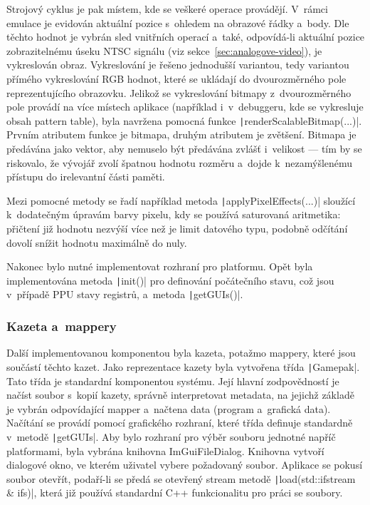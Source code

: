 Strojový cyklus je pak místem, kde se veškeré operace provádějí. V~rámci emulace je evidován aktuální pozice s~ohledem na obrazové řádky a~body. Dle těchto hodnot je vybrán sled vnitřních operací a~také, odpovídá-li aktuální pozice zobrazitelnému úseku NTSC signálu (viz sekce~\ref{sec:analogove-video}), je vykreslován obraz. Vykreslování je řešeno jednodušší variantou, tedy variantou přímého vykreslování RGB hodnot, které se ukládají do dvourozměrného pole reprezentujícího obrazovku. Jelikož se vykreslování bitmapy z~dvourozměrného pole provádí na více místech aplikace (například i~v~debuggeru, kde se vykresluje obsah pattern table), byla navržena pomocná funkce \texttt|renderScalableBitmap(...)|. Prvním atributem funkce je bitmapa, druhým atributem je zvětšení. Bitmapa je předávána jako vektor, aby nemuselo být předávána zvlášť i~velikost --- tím by se riskovalo, že vývojář zvolí špatnou hodnotu rozměru a~dojde k~nezamýšlenému přístupu do irelevantní části paměti.

Mezi pomocné metody se řadí například metoda \texttt|applyPixelEffects(...)| sloužící k~dodatečným úpravám barvy pixelu, kdy se používá saturovaná aritmetika: přičtení již hodnotu nezvýší více než je limit datového typu, podobně odčítání dovolí snížit hodnotu maximálně do nuly.

Nakonec bylo nutné implementovat rozhraní pro platformu. Opět byla implementována metoda \texttt|init()| pro definování počátečního stavu, což jsou v~případě PPU stavy registrů, a~metoda \texttt|getGUIs()|.

\subsubsection{Kazeta a~mappery}
Další implementovanou komponentou byla kazeta, potažmo mappery, které jsou součástí těchto kazet. Jako reprezentace kazety byla vytvořena třída \texttt|Gamepak|. Tato třída je standardní komponentou systému. Její hlavní zodpovědností je načíst soubor s~kopií kazety, správně interpretovat metadata, na jejichž základě je vybrán odpovídající mapper a~načtena data (program a~grafická data). Načítání se provádí pomocí grafického rozhraní, které třída definuje standardně v~metodě \texttt|getGUIs|. Aby bylo rozhraní pro výběr souboru jednotné napříč platformami, byla vybrána knihovna ImGuiFileDialog. Knihovna vytvoří dialogové okno, ve kterém uživatel vybere požadovaný soubor. Aplikace se pokusí soubor otevřít, podaří-li se předá se otevřený stream metodě \texttt|load(std::ifstream & ifs)|, která již používá standardní C++ funkcionalitu pro práci se soubory.

